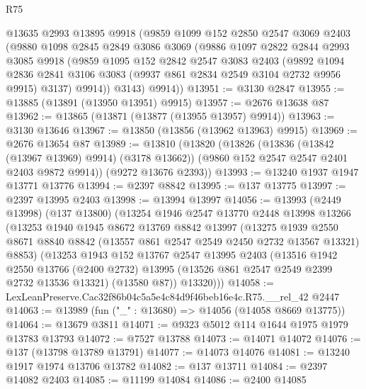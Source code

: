 \begin{lexlean}{R75}
\begin{coremodule}
      @13635
      @2993
      @13895
      @9918
      (@9859
        @1099
        @152
        @2850
        @2547
        @3069
        @2403
        (@9880
          @1098
          @2845
          @2849
          @3086
          @3069
          (@9886
            @1097
            @2822
            @2844
            @2993
            @3085
            @9918
            (@9859
              @1095
              @152
              @2842
              @2547
              @3083
              @2403
              (@9892
                @1094
                @2836
                @2841
                @3106
                @3083
                (@9937 @861 @2834 @2549 @3104 @2732 @9956 @9915)
                @3137)
              @9914))
          @3143)
        @9914))
@13951 := @3130 @2847
@13955 := @13885 (@13891 (@13950 @13951) @9915)
@13957 := @2676 @13638 @87
@13962 := @13865 (@13871 (@13877 (@13955 @13957) @9914))
@13963 := @3130 @13646
@13967 := @13850 (@13856 (@13962 @13963) @9915)
@13969 := @2676 @13654 @87
@13989 := @13810
    (@13820
      (@13826
        (@13836 (@13842 (@13967 @13969) @9914) (@3178 @13662))
        (@9860 @152 @2547 @2547 @2401 @2403 @9872 @9914))
      (@9272 @13676 @2393))
@13993 := @13240 @1937 @1947 @13771 @13776
@13994 := @2397 @8842
@13995 := @137 @13775
@13997 := @2397 @13995 @2403
@13998 := @13994 @13997
@14056 := @13993
    (@2449 @13998)
    (@137 @13800)
    (@13254
      @1946
      @2547
      @13770
      @2448
      @13998
      @13266
      (@13253
        @1940
        @1945
        @8672
        @13769
        @8842
        @13997
        (@13275
          @1939
          @2550
          @8671
          @8840
          @8842
          (@13557 @861 @2547 @2549 @2450 @2732 @13567 @13321)
          @8853)
        (@13253
          @1943
          @152
          @13767
          @2547
          @13995
          @2403
          (@13516
            @1942
            @2550
            @13766
            (@2400 @2732)
            @13995
            (@13526 @861 @2547 @2549 @2399 @2732 @13536 @13321)
            (@13580 @87))
          @13320)))
@14058 := LexLeanPreserve.Cac32f86b04c5a5e4c84d9f46beb16e4c.R75.__rel_42 @2447
@14063 := @13989 (fun ("_" : @13680) => @14056 (@14058 @8669 @13775))
@14064 := @13679 @3811
@14071 := @9323 @5012 @114 @1644 @1975 @1979 @13783 @13793
@14072 := @7527 @13788
@14073 := @14071 @14072
@14076 := @137 (@13798 @13789 @13791)
@14077 := @14073 @14076
@14081 := @13240 @1917 @1974 @13706 @13782
@14082 := @137 @13711
@14084 := @2397 @14082 @2403
@14085 := @11199 @14084
@14086 := @2400 @14085

\end{coremodule}
\end{lexlean}
